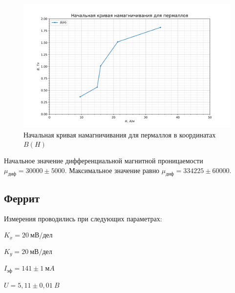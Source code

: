 \documentclass[a4paper, 12pt]{article}
\begin{document}
\begin{figure}[h!]
\begin{center}
    \includegraphics[scale=0.7]{3.4.5_2.png}
\end{center}
\caption{Начальная кривая намагничивания для пермаллоя в координатах $B(H)$}
\label{fig:Perm:nach_petlya}
\end{figure}

Начальное значение дифференциальной магнитной проницаемости \newline $\mu_{диф} = 30000\pm5000$. Максимальное значение равно $\mu_{диф} = 334225\pm60000$.

\newpage

\subsection{Феррит}

Измерения проводились при следующих параметрах:
\begin{description}
\item{} $K_x = 20~мВ/дел$
\item{} $K_y = 20~мВ/дел$
\item{} $I_{эф} = 141\pm1~мA$
\item{} $U = 5,11\pm0,01~B$
\end{description}
\end{document}
